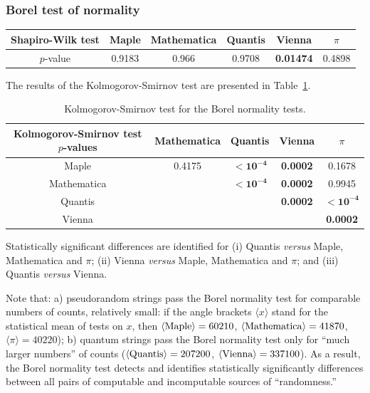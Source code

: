 \documentclass[10pt]{article}%
\begin{document}
\subsubsection{Borel test of normality}

\begin{center}
\begin{tabular}
[c]{ c c c c c c }\hline\hline
Shapiro-Wilk test & Maple & Mathematica & Quantis & Vienna  & $\pi$\\\hline
$p$-value %
& 0.9183 & 0.966 & 0.9708 &
\bf{0.01474} & 0.4898\\\hline\hline
\end{tabular}
\end{center}

\fi

The results of the Kolmogorov-Smirnov test are presented in Table~\ref{tab:5b}.

\begin{table}
\caption{Kolmogorov-Smirnov test for the Borel normality tests.}\label{tab:5b}
 \begin{center}
 \begin{tabular}
[c]{ c c c c c }
\hline\hline
Kolmogorov-Smirnov test $p$-values & Mathematica & Quantis & Vienna & $\pi$ \\\hline
Maple & 0.4175 &$\mathbf{< 10^{-4}}$%
& \bf{0.0002}
& 0.1678\\
Mathematica &  & $\mathbf{< 10^{-4}}$%
& \bf{0.0002} & 0.9945\\
Quantis &  &  & \bf{0.0002} & $\mathbf{< 10^{-4}}$%
\\
Vienna &  &  &  & \bf{0.0002}\\\hline\hline
\end{tabular}
\end{center}
\end{table}


Statistically significant differences are identified for
(i) Quantis {\it versus}  Maple, Mathematica and $\pi$;
(ii) Vienna {\it versus}  Maple, Mathematica and $\pi$; and
(iii) Quantis {\it versus}  Vienna.


Note that:  a) pseudorandom strings pass the Borel normality test for comparable numbers of counts, relatively small:
if the angle brackets   $\langle x \rangle$ stand for the statistical mean of tests on $x$, then
 $\langle  {\rm  Maple} \rangle  = 60210$, $\langle  {\rm  Mathematica} \rangle  = 41870$,
$\langle  \pi \rangle  = 40220$); b) quantum strings pass the Borel normality test only for ``much larger numbers''
of counts
($\langle  {\rm  Quantis} \rangle  = 207200$, $\langle  {\rm  Vienna} \rangle  = 337100$).
As a result, the Borel normality test detects and identifies
statistically significantly differences between all pairs of computable and incomputable  sources of ``randomness.''
\end{document}
